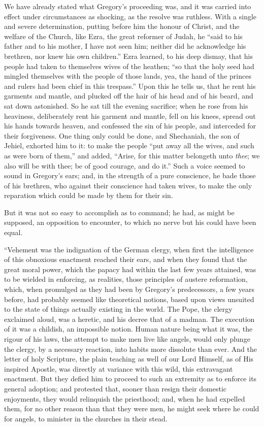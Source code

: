We have already stated what Gregory's proceeding
was, and it was carried into effect under circumstances as shocking,
as the resolve was ruthless. With a single and severe determination,
putting before him the honour of Christ, and the welfare of the
Church, like Ezra, the great reformer of Judah, he ``said to his father
and to his mother, I have not seen him; neither did he acknowledge his
brethren, nor knew his own children.'' Ezra learned, to his deep
dismay, that his people had taken to themselves wives of the heathen; ``so
that the holy seed had mingled themselves with the people of those
lands, yea, the hand of the princes and rulers had been chief in this
trespass.'' Upon this he tells us, that he rent his garments and
mantle, and plucked off the hair of his head and of his beard, and sat
down astonished. So he sat till the evening sacrifice; when he rose
from his heaviness, deliberately rent his garment and mantle, fell on
his knees, spread out his hands towards heaven, and confessed the sin
of his people, and interceded for their forgiveness. One thing only
could be done, and Shechaniah, the son of Jehiel, exhorted him to it:
to make the people ``put away all the wives, and such as were born of
them,'' and added, ``Arise, for this matter belongeth unto \emph{thee}; we also
will be with thee; be of good courage, and do it.'' Such a voice seemed
to sound in Gregory's ears; and, in the strength of a pure conscience,
he bade those of his brethren, who against their conscience had taken
wives, to make the only reparation which could be made by them for
their sin.

But it was not so easy to accomplish as to
command; he had, as might be supposed, an opposition to encounter, to
which no nerve but his could have been equal.

``Vehement
was the indignation of the German clergy, when first the intelligence
of this obnoxious enactment reached their ears, and when they found
that the great moral power, which the papacy had within the last few
years attained, was to be wielded in enforcing, as realities, those
principles of austere reformation, which, when promulged as they had
been by Gregory's predecessors, a few years before, had probably
seemed like theoretical notions, based upon views unsuited to the
state of things actually existing in the world. The Pope, the clergy
exclaimed aloud, was a heretic, and his decree that of a madman. The
execution of it was a childish, an impossible notion. Human nature
being what it was, the rigour of his laws, the attempt to make men
live like angels, would only plunge the clergy, by a necessary
reaction, into habits more dissolute than ever. And the letter of holy
Scripture, the plain teaching as well of our Lord Himself, as of His
inspired Apostle, was directly at variance with this wild, this
extravagant enactment. But they defied him to proceed to such an
extremity as to enforce its general adoption; and protested that,
sooner than resign their domestic enjoyments, they would relinquish
the priesthood; and, when he had expelled them, for no other reason
than that they were men, he might seek where he could for angels, to
minister in the churches in their stead.

